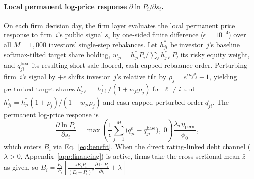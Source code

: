 \documentclass[11pt]{article}
\begin{document}
\paragraph{Local permanent log-price response $\partial \ln P_i / \partial s_i$.}
On each firm decision day, the firm layer evaluates the local permanent price response to firm~$i$'s public signal $s_i$ by one-sided finite difference ($\epsilon = 10^{-4}$) over all $M = 1{,}000$ investors' single-step rebalances. Let $h^*_{ji}$ be investor~$j$'s baseline softmax-tilted target share holding, $w_{ji} = h^*_{ji} P_i / \sum_\ell h^*_{j\ell} P_\ell$ its risky equity weight, and $q_{ji}^{\mathrm{base}}$ its resulting short-sale-floored, cash-capped rebalance order. Perturbing firm~$i$'s signal by $+\epsilon$ shifts investor~$j$'s relative tilt by $\rho_j = e^{\epsilon \kappa_j \theta_j} - 1$, yielding perturbed target shares $h^\epsilon_{j\ell} = h^*_{j\ell} / (1 + w_{ji}\rho_j)$ for $\ell \neq i$ and $h^\epsilon_{ji} = h^*_{ji}(1 + \rho_j)/(1 + w_{ji}\rho_j)$ and cash-capped perturbed order $q^\epsilon_{ji}$. The permanent log-price response is
\begin{equation}
\frac{\partial \ln P_i}{\partial s_i} = \max\!\left(\frac{1}{\epsilon}\sum_{j=1}^M \big(q^\epsilon_{ji} - q_{ji}^{\mathrm{base}}\big),\; 0\right)\frac{\lambda_p\,\eta_{\mathrm{perm}}}{\phi_0},
\label{eq:dlogpds}
\end{equation}
which enters $B_i$ via Eq.~\eqref{eq:benefit}. When the direct rating-linked debt channel ($\lambda > 0$, Appendix~\ref{app:financing}) is active, firms take the cross-sectional mean $\bar z$ as given, so $B_i = \frac{E_i}{P_i}\!\left[\frac{s E_i P_i}{(E_i+P_i)^2}\frac{\partial \ln P_i}{\partial s_i} + \lambda\right]$.
\end{document}
